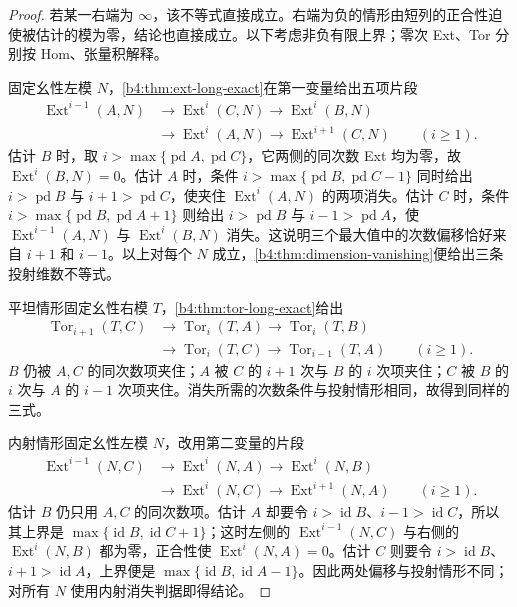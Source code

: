 \begin{proof}
	若某一右端为 \(\infty\)，该不等式直接成立。右端为负的情形由短列的正合性迫使被估计的模为零，结论也直接成立。以下考虑非负有限上界；零次 Ext、Tor 分别按 Hom、张量积解释。

	固定幺性左模 \(N\)，\cref{b4:thm:ext-long-exact}在第一变量给出五项片段
	\[
		\begin{aligned}
			\operatorname{Ext}^{i-1}(A,N)&\longrightarrow\operatorname{Ext}^i(C,N) \longrightarrow\operatorname{Ext}^i(B,N)\\
			&\longrightarrow\operatorname{Ext}^i(A,N) \longrightarrow\operatorname{Ext}^{i+1}(C,N) \qquad(i\ge1).
		\end{aligned}
	\]
	估计 \(B\) 时，取 \(i>\max\{\operatorname{pd}A,\operatorname{pd}C\}\)，它两侧的同次数 Ext 均为零，故 \(\operatorname{Ext}^i(B,N)=0\)。估计 \(A\) 时，条件 \(i>\max\{\operatorname{pd}B,\operatorname{pd}C-1\}\) 同时给出 \(i>\operatorname{pd}B\) 与 \(i+1>\operatorname{pd}C\)，使夹住 \(\operatorname{Ext}^i(A,N)\) 的两项消失。估计 \(C\) 时，条件 \(i>\max\{\operatorname{pd}B,\operatorname{pd}A+1\}\) 则给出 \(i>\operatorname{pd}B\) 与 \(i-1>\operatorname{pd}A\)，使 \(\operatorname{Ext}^{i-1}(A,N)\) 与 \(\operatorname{Ext}^i(B,N)\) 消失。这说明三个最大值中的次数偏移恰好来自 \(i+1\) 和 \(i-1\)。以上对每个 \(N\) 成立，\cref{b4:thm:dimension-vanishing}便给出三条投射维数不等式。

	平坦情形固定幺性右模 \(T\)，\cref{b4:thm:tor-long-exact}给出
	\[
		\begin{aligned}
			\operatorname{Tor}_{i+1}(T,C)&\longrightarrow\operatorname{Tor}_i(T,A) \longrightarrow\operatorname{Tor}_i(T,B)\\
			&\longrightarrow\operatorname{Tor}_i(T,C) \longrightarrow\operatorname{Tor}_{i-1}(T,A) \qquad(i\ge1).
		\end{aligned}
	\]
	\(B\) 仍被 \(A,C\) 的同次数项夹住；\(A\) 被 \(C\) 的 \(i+1\) 次与 \(B\) 的 \(i\) 次项夹住；\(C\) 被 \(B\) 的 \(i\) 次与 \(A\) 的 \(i-1\) 次项夹住。消失所需的次数条件与投射情形相同，故得到同样的三式。

	内射情形固定幺性左模 \(N\)，改用第二变量的片段
	\[
		\begin{aligned}
			\operatorname{Ext}^{i-1}(N,C)&\longrightarrow\operatorname{Ext}^i(N,A) \longrightarrow\operatorname{Ext}^i(N,B)\\
			&\longrightarrow\operatorname{Ext}^i(N,C) \longrightarrow\operatorname{Ext}^{i+1}(N,A) \qquad(i\ge1).
		\end{aligned}
	\]
	估计 \(B\) 仍只用 \(A,C\) 的同次数项。估计 \(A\) 却要令 \(i>\operatorname{id}B\)、\(i-1>\operatorname{id}C\)，所以其上界是 \(\max\{\operatorname{id}B,\operatorname{id}C+1\}\)；这时左侧的 \(\operatorname{Ext}^{i-1}(N,C)\) 与右侧的 \(\operatorname{Ext}^i(N,B)\) 都为零，正合性使 \(\operatorname{Ext}^i(N,A)=0\)。估计 \(C\) 则要令 \(i>\operatorname{id}B\)、\(i+1>\operatorname{id}A\)，上界便是 \(\max\{\operatorname{id}B,\operatorname{id}A-1\}\)。因此两处偏移与投射情形不同；对所有 \(N\) 使用内射消失判据即得结论。
\end{proof}

